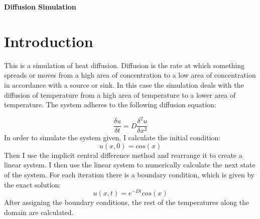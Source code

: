 \documentclass[12pt]{article}
\begin{document}
\centerline{\Large\textbf{Diffusion Simulation}}
\vspace{0cm}


\section{Introduction}\label{sec::Intro}
This is a simulation of heat diffusion. Diffusion is the rate at which something spreads or moves from a high area of concentration to a low area of concentration in accordance with a source or sink. In this case the simulation deals with the diffusion of temperature from a high area of temperature to a lower area of temperature. The system adheres to the following diffusion equation:

\begin{equation}
\frac{\delta u}{\delta t} = D\frac{\delta ^2 u}{\delta x^2}
\end{equation}
In order to simulate the system given, I calculate the initial condition:
\begin{equation}
u(x,0)=cos(x)
\end{equation}
Then I use the implicit central difference method and rearrange it to create a linear system. I then use the linear system to numerically calculate the next state of the system. For each iteration there is a boundary condition, which is given by the exact solution:
\begin{equation}
u(x,t)=e^{-Dt}cos(x)
\end{equation}
After assigning the boundary conditions, the rest of the temperatures along the domain are calculated.
\end{document}
